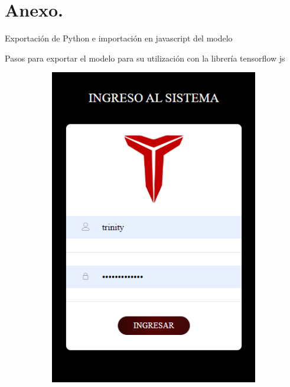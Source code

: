\fancyhead{}
\fancyfoot{}
\cfoot{\thepage}


\chapter{Anexo.}

Exportación de Python  e importación en javascript del modelo

Pasos para exportar el modelo para su utilización con la librería tensorflow js



\begin{figure}[H]
    \begin{center}
        \begin{subfigure}{0.28\textwidth}
            \includegraphics[width=\linewidth]{./sistema/login.png}

\end{subfigure}
\end{center}
\end{figure}
